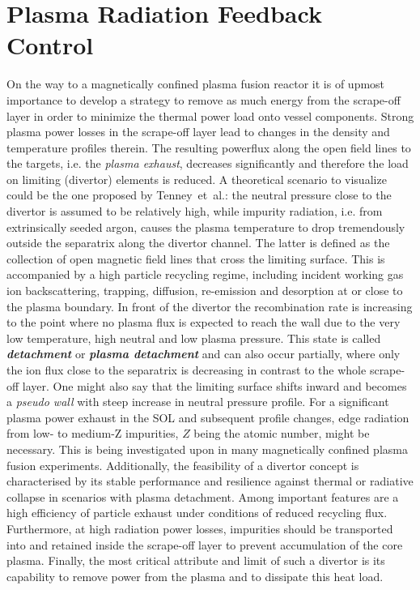 %
\chapter{Plasma Radiation Feedback Control}\label{chap:realtimefeedback}%
%
    On the way to a magnetically confined plasma fusion reactor it is of upmost importance to develop a strategy to remove as much energy from the scrape-off layer in order to minimize the thermal power load onto vessel components\cite{Feng2016,Feng2005,Kallenbach2013,Pacher2007,Schmitz2020}. Strong plasma power losses in the scrape-off layer lead to changes in the density and temperature profiles therein. The resulting powerflux along the open field lines to the targets, i.e. the \textit{plasma exhaust}, decreases significantly and therefore the load on limiting (divertor) elements is reduced\cite{Kallenbach2013}. A theoretical scenario to visualize could be the one proposed by Tenney~et~al.\cite{Tenney1974}: the neutral pressure close to the divertor is assumed to be relatively high, while impurity radiation, i.e. from extrinsically seeded argon, causes the plasma temperature to drop tremendously outside the separatrix along the divertor channel. The latter is defined as the collection of open magnetic field lines that cross the limiting surface. This is accompanied by a high particle recycling regime, including incident working gas ion backscattering, trapping, diffusion, re-emission and desorption at or close to the plasma boundary\cite{Marmar1978,Stangeby1990}. In front of the divertor the recombination rate is increasing to the point where no plasma flux is expected to reach the wall due to the very low temperature, high neutral and low plasma pressure. This state is called \textbf{\textit{detachment}} or \textbf{\textit{plasma detachment}} and can also occur partially, where only the ion flux close to the separatrix is decreasing in contrast to the whole scrape-off layer\cite{Loarte1998}. One might also say that the limiting surface shifts inward and becomes a \textit{pseudo wall} with steep increase in neutral pressure profile. For a significant plasma power exhaust in the SOL and subsequent profile changes, edge radiation from low- to medium-Z impurities, $Z$ being the atomic number, might be necessary. This is being investigated upon in many magnetically confined plasma fusion experiments\cite{Pacher2007,Kallenbach2013}. Additionally, the feasibility of a divertor concept is characterised by its stable performance and resilience against thermal or radiative collapse in scenarios with plasma detachment. Among important features are a high efficiency of particle exhaust under conditions of reduced recycling flux. Furthermore, at high radiation power losses, impurities should be transported into and retained inside the scrape-off layer to prevent accumulation of the core plasma. Finally, the most critical attribute and limit of such a divertor is its capability to remove power from the plasma and to dissipate this heat load.\\%
